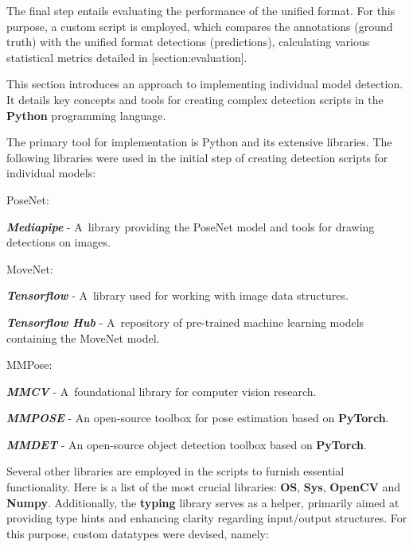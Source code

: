 The final step entails evaluating the performance of the unified format. For this purpose, a custom script is employed, which compares the annotations (ground truth) with the unified format detections (predictions), calculating various statistical metrics detailed in [section:evaluation].

This section introduces an approach to implementing individual model detection. It details key concepts and tools for creating complex detection scripts in the {\bf Python} programming language.

The primary tool for implementation is Python and its extensive libraries. The following libraries were used in the initial step of creating detection scripts for individual models:

\startitemize[n]
    \item PoseNet:
        \startitemize[1]
            \item {\bf {\em Mediapipe}} - A~library providing the PoseNet model and tools for drawing detections on images.
        \stopitemize
    \item MoveNet:
        \startitemize[1]
            \item {\bf {\em Tensorflow}} - A~library used for working with image data structures.
            \item {\bf {\em Tensorflow Hub}} - A~repository of pre-trained machine learning models containing the MoveNet model.
        \stopitemize
    \item MMPose:
        \startitemize[1]
            \item {\bf {\em MMCV}} - A~foundational library for computer vision research.
            \item {\bf {\em MMPOSE}} - An open-source toolbox for pose estimation based on {\bf PyTorch}.
            \item {\bf {\em MMDET}} - An open-source object detection toolbox based on {\bf PyTorch}.
        \stopitemize
\stopitemize

Several other libraries are employed in the scripts to furnish essential functionality. Here is a list of the most crucial libraries: {\bf OS}, {\bf Sys}, {\bf OpenCV} and {\bf Numpy}. Additionally, the {\bf typing} library serves as a helper, primarily aimed at providing type hints and enhancing clarity regarding input/output structures. For this purpose, custom datatypes were devised, namely:

